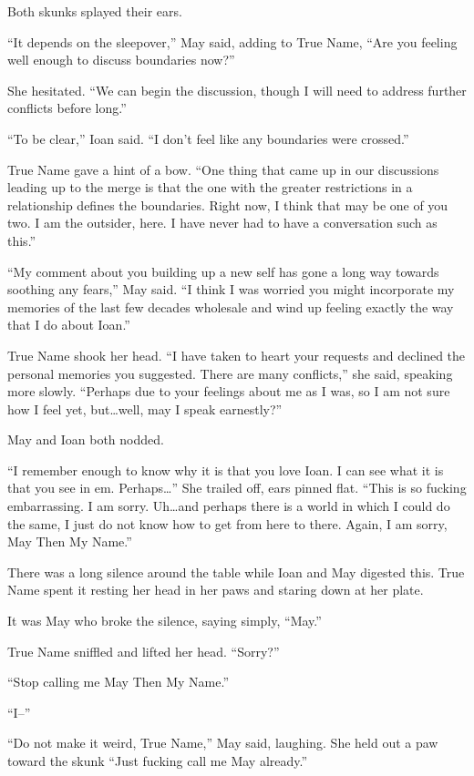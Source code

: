 Both skunks splayed their ears.

``It depends on the sleepover,'' May said, adding to True Name, ``Are you feeling well enough to discuss boundaries now?''

She hesitated. ``We can begin the discussion, though I will need to address further conflicts before long.''

``To be clear,'' Ioan said. ``I don't feel like any boundaries were crossed.''

True Name gave a hint of a bow. ``One thing that came up in our discussions leading up to the merge is that the one with the greater restrictions in a relationship defines the boundaries. Right now, I think that may be one of you two. I am the outsider, here. I have never had to have a conversation such as this.''

``My comment about you building up a new self has gone a long way towards soothing any fears,'' May said. ``I think I was worried you might incorporate my memories of the last few decades wholesale and wind up feeling exactly the way that I do about Ioan.''

True Name shook her head. ``I have taken to heart your requests and declined the personal memories you suggested. There are many conflicts,'' she said, speaking more slowly. ``Perhaps due to your feelings about me as I was, so I am not sure how I feel yet, but\ldots well, may I speak earnestly?''

May and Ioan both nodded.

``I remember enough to know why it is that you love Ioan. I can see what it is that you see in em. Perhaps\ldots{}'' She trailed off, ears pinned flat. ``This is so fucking embarrassing. I am sorry. Uh\ldots and perhaps there is a world in which I could do the same, I just do not know how to get from here to there. Again, I am sorry, May Then My Name.''

There was a long silence around the table while Ioan and May digested this. True Name spent it resting her head in her paws and staring down at her plate.

It was May who broke the silence, saying simply, ``May.''

True Name sniffled and lifted her head. ``Sorry?''

``Stop calling me May Then My Name.''

``I--''

``Do not make it weird, True Name,'' May said, laughing. She held out a paw toward the skunk ``Just fucking call me May already.''

